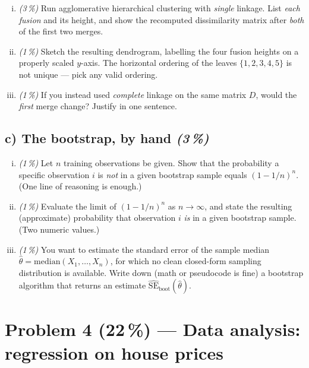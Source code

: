 \documentclass[11pt,a4paper]{article}
\newcommand{\points}[1]{\textbf{(#1\,\%)}}
\newcommand{\subpoints}[1]{\textit{(#1\,\%)}}
\begin{document}
\begin{enumerate}[(i)]
  \item \subpoints{3} Run agglomerative hierarchical clustering with \emph{single} linkage. List \emph{each fusion} and its height, and show the recomputed dissimilarity matrix after \emph{both} of the first two merges.
  \item \subpoints{1} Sketch the resulting dendrogram, labelling the four fusion heights on a properly scaled $y$-axis. The horizontal ordering of the leaves $\{1,2,3,4,5\}$ is not unique --- pick any valid ordering.
  \item \subpoints{1} If you instead used \emph{complete} linkage on the same matrix $D$, would the \emph{first} merge change? Justify in one sentence.
\end{enumerate}

\subsection*{c) The bootstrap, by hand \subpoints{3}}
\begin{enumerate}[(i)]
  \item \subpoints{1} Let $n$ training observations be given. Show that the probability a specific observation $i$ is \emph{not} in a given bootstrap sample equals $(1 - 1/n)^n$. (One line of reasoning is enough.)
  \item \subpoints{1} Evaluate the limit of $(1 - 1/n)^n$ as $n \to \infty$, and state the resulting (approximate) probability that observation $i$ \emph{is} in a given bootstrap sample. (Two numeric values.)
  \item \subpoints{1} You want to estimate the standard error of the sample median $\hat\theta = \mathrm{median}(X_1, \dots, X_n)$, for which no clean closed-form sampling distribution is available. Write down (math or pseudocode is fine) a bootstrap algorithm that returns an estimate $\widehat{\mathrm{SE}}_{\text{boot}}(\hat\theta)$.
\end{enumerate}

\vfill\eject

\section*{Problem 4 \points{22} --- Data analysis: regression on house prices}
\end{document}
